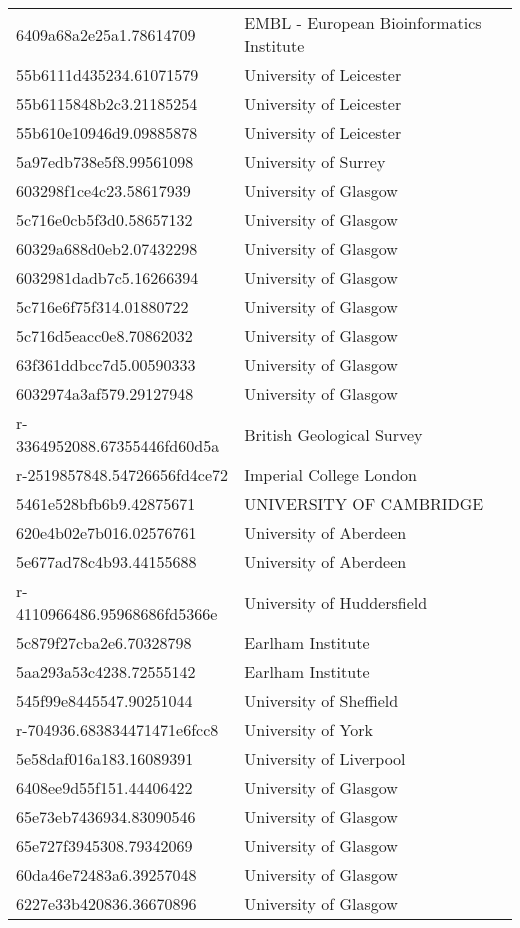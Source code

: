 \begin{tabular}{ll}
6409a68a2e25a1.78614709 & EMBL - European Bioinformatics Institute \\
55b6111d435234.61071579 & University of Leicester \\
55b6115848b2c3.21185254 & University of Leicester \\
55b610e10946d9.09885878 & University of Leicester \\
5a97edb738e5f8.99561098 & University of Surrey \\
603298f1ce4c23.58617939 & University of Glasgow \\
5c716e0cb5f3d0.58657132 & University of Glasgow \\
60329a688d0eb2.07432298 & University of Glasgow \\
6032981dadb7c5.16266394 & University of Glasgow \\
5c716e6f75f314.01880722 & University of Glasgow \\
5c716d5eacc0e8.70862032 & University of Glasgow \\
63f361ddbcc7d5.00590333 & University of Glasgow \\
6032974a3af579.29127948 & University of Glasgow \\
r-3364952088.67355446fd60d5a & British Geological Survey \\
r-2519857848.54726656fd4ce72 & Imperial College London \\
5461e528bfb6b9.42875671 & UNIVERSITY OF CAMBRIDGE \\
620e4b02e7b016.02576761 & University of Aberdeen \\
5e677ad78c4b93.44155688 & University of Aberdeen \\
r-4110966486.95968686fd5366e & University of Huddersfield \\
5c879f27cba2e6.70328798 & Earlham Institute \\
5aa293a53c4238.72555142 & Earlham Institute \\
545f99e8445547.90251044 & University of Sheffield \\
r-704936.683834471471e6fcc8 & University of York \\
5e58daf016a183.16089391 & University of Liverpool \\
6408ee9d55f151.44406422 & University of Glasgow \\
65e73eb7436934.83090546 & University of Glasgow \\
65e727f3945308.79342069 & University of Glasgow \\
60da46e72483a6.39257048 & University of Glasgow \\
6227e33b420836.36670896 & University of Glasgow \\

\end{tabular}

